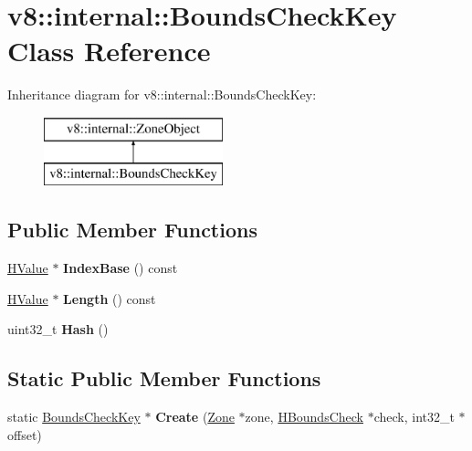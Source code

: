 \hypertarget{classv8_1_1internal_1_1_bounds_check_key}{}\section{v8\+:\+:internal\+:\+:Bounds\+Check\+Key Class Reference}
\label{classv8_1_1internal_1_1_bounds_check_key}
Inheritance diagram for v8\+:\+:internal\+:\+:Bounds\+Check\+Key\+:\begin{figure}[H]
\begin{center}
\leavevmode
\includegraphics[height=2.000000cm]{classv8_1_1internal_1_1_bounds_check_key}
\end{center}
\end{figure}
\subsection*{Public Member Functions}
\begin{DoxyCompactItemize}
\item 
\hyperlink{classv8_1_1internal_1_1_h_value}{H\+Value} $\ast$ {\bfseries Index\+Base} () const \hypertarget{classv8_1_1internal_1_1_bounds_check_key_aeb1db461583e7055f141afc96ba1180a}{}\label{classv8_1_1internal_1_1_bounds_check_key_aeb1db461583e7055f141afc96ba1180a}

\item 
\hyperlink{classv8_1_1internal_1_1_h_value}{H\+Value} $\ast$ {\bfseries Length} () const \hypertarget{classv8_1_1internal_1_1_bounds_check_key_a3a10a7211da00964908fea5db326e9a1}{}\label{classv8_1_1internal_1_1_bounds_check_key_a3a10a7211da00964908fea5db326e9a1}

\item 
uint32\+\_\+t {\bfseries Hash} ()\hypertarget{classv8_1_1internal_1_1_bounds_check_key_a0eec34fbaaf08be0e30937895419e58a}{}\label{classv8_1_1internal_1_1_bounds_check_key_a0eec34fbaaf08be0e30937895419e58a}

\end{DoxyCompactItemize}
\subsection*{Static Public Member Functions}
\begin{DoxyCompactItemize}
\item 
static \hyperlink{classv8_1_1internal_1_1_bounds_check_key}{Bounds\+Check\+Key} $\ast$ {\bfseries Create} (\hyperlink{classv8_1_1internal_1_1_zone}{Zone} $\ast$zone, \hyperlink{classv8_1_1internal_1_1_h_bounds_check}{H\+Bounds\+Check} $\ast$check, int32\+\_\+t $\ast$offset)\hypertarget{classv8_1_1internal_1_1_bounds_check_key_aa50c37a0be21326cf120f4734f4f0867}{}\label{classv8_1_1internal_1_1_bounds_check_key_aa50c37a0be21326cf120f4734f4f0867}

\end{DoxyCompactItemize}
